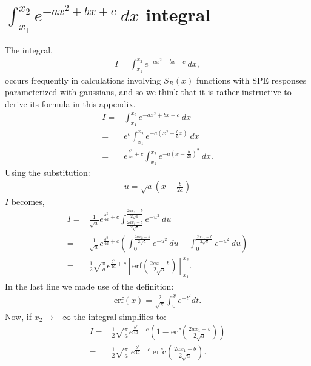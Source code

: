 \documentclass[preprint,12pt]{elsarticle}
\begin{document}
\section{$\int_{ x_1 }^{x_2}  e^{-a x^2 +b x +c } \ dx$ integral}
\label{app:int}

The integral, 
\begin{align}
I = \int_{ x_1 }^{x_2}  e^{-a x^2 +b x +c } \ dx,
\end{align}
occurs frequently in calculations involving $S_R(x)$ functions with SPE responses parameterized with gaussians, and so we think that it is rather instructive to derive its formula in this appendix. 
\begin{align}
I = & \int_{ x_1 }^{x_2}  e^{-a x^2 +b x +c } \ dx \nonumber \\
  = & e^c \int_{ x_1 }^{x_2}  e^{-a ( x^2 - \frac{b}{a} x )} \ dx  \nonumber \\
  = & e^{\frac{b^2}{4a}+c} \int_{ x_1 }^{x_2}  e^{-a ( x - \frac{b}{2a} )^2} \ dx. 
\end{align}
Using the substitution: 
\begin{align}
u = \sqrt{a} ( x - \frac{b}{2a} )  
\end{align}
$I$ becomes,
\begin{align}
I = &  \frac{1}{\sqrt{a}} e^{\frac{b^2}{4a}+c} \int_{ \frac{2a x_1 -b }{2\sqrt{a}} }^{ \frac{2a x_2 -b }{2\sqrt{a}} }  e^{-u^2 } \ du \nonumber \\
  = & \frac{1}{\sqrt{a}} e^{\frac{b^2}{4a}+c} \left(   \int_{ 0 }^{ \frac{2a x_2 -b }{2\sqrt{a}} }  e^{-u^2 } \ du -  \int^{ \frac{2a x_1 -b }{2\sqrt{a}} }_{ 0 }  e^{-u^2 } \ du\right)  \nonumber \\
  = &  \frac{1}{2}  \sqrt{\frac{\pi}{a} } e^{\frac{b^2}{4a}+c} \left[ \text{erf}\left({ \frac{2a x -b }{2\sqrt{a}} }\right) \right]^{ x_2 }_{ x_1 }.
\end{align}
In the last line we made use of the definition:
\begin{align}
 \text{erf}(x) = \frac{2}{\sqrt{\pi}} \int_0^x e^{-t^2} dt. 
 \end{align}
 Now, if $x_2\rightarrow +\infty$ the integral simplifies to:
 \begin{align}
I = &  \frac{1}{2}  \sqrt{\frac{\pi}{a} } e^{\frac{b^2}{4a}+c} \left( 1 - \text{erf}\left({ \frac{2a x_1 -b }{2\sqrt{a}} }\right) \right) \nonumber \\
  = & \frac{1}{2}  \sqrt{\frac{\pi}{a} } \ e^{\frac{b^2}{4a}+c} \ \text{erfc}\left({ \frac{2a x_1 -b }{2\sqrt{a}} }\right). \label{eq:intg}
\end{align}
\end{document}

